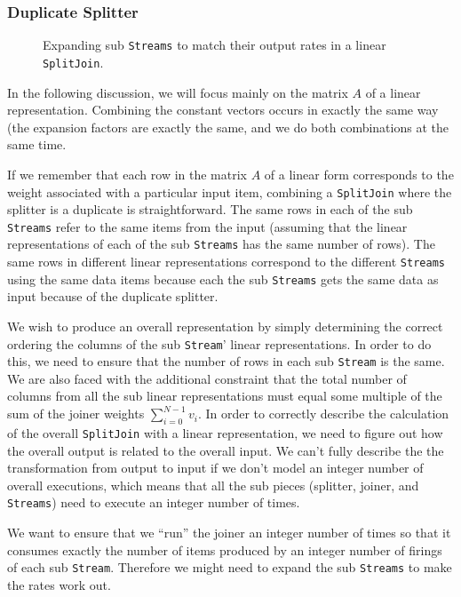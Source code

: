 \subsubsection{Duplicate Splitter}

\begin{figure}
\center
\epsfxsize=3.0in
\caption{Expanding sub {\tt Streams} to match their output rates in a linear {\tt SplitJoin}.}
\label{fig:splitjoin-duplicate-ratematch}
\end{figure}

In the following discussion, we will focus mainly on the matrix $A$ of a linear representation.
Combining the constant vectors occurs in exactly the same way (the expansion factors are exactly 
the same, and we do both combinations at the same time.

If we remember that each row in the matrix $A$ of a linear form corresponds to the
weight associated with a particular input item, combining a {\tt SplitJoin} 
where the splitter is a duplicate is straightforward.
The same rows in each of the sub {\tt Streams} refer to the same items from the
input (assuming that the linear representations of each of the sub {\tt Streams} has the same number
of rows). The same rows in different linear representations correspond to the different 
{\tt Streams} using the same data items because each the sub {\tt Streams} gets the same
data as input because of the duplicate splitter. 

We wish to produce an overall representation by simply determining the correct 
ordering the columns of the sub {\tt Stream}' linear representations. In order to
do this, we need to ensure that the number of rows in each sub {\tt Stream} is the same.
We are also faced with the additional constraint that the total number of columns 
from all the sub linear representations must equal some multiple of the sum of the
joiner weights $\sum_{i=0}^{N-1}v_i$. In order to correctly describe the calculation
of the overall {\tt SplitJoin} with a linear representation, we need to figure out 
how the overall output is related to the overall input. We can't fully describe the
the transformation from output to input if we don't model an integer number of overall
executions, which means that all the sub pieces (splitter, joiner, and {\tt Streams})
need to execute an integer number of times.

We want to ensure that we ``run'' the joiner an integer number of times so that it 
consumes exactly the number of items produced by an integer number of firings of
each sub {\tt Stream}. Therefore we might need to expand the sub {\tt Streams}
to make the rates work out.

